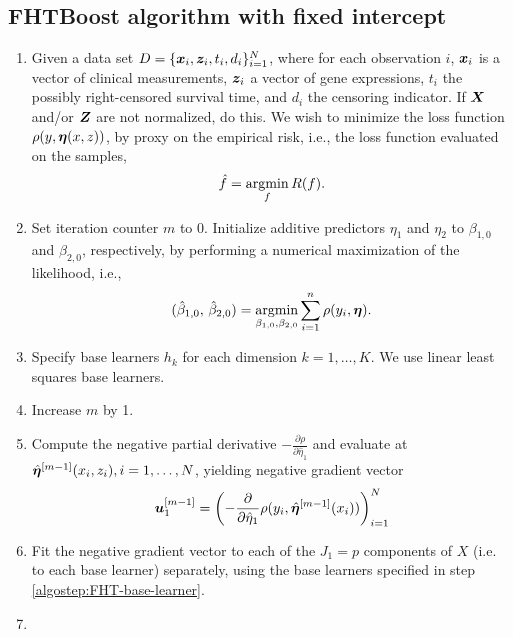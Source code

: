 \subsection{FHTBoost algorithm with fixed intercept}
\label{algo:fhtboost}
\begin{enumerate}
    \item
        Given a data set $D=\{\bm{x}_i, \bm{z}_i, t_i,d_i\}_{i=1}^N$, where for each observation $i$, $\bm{x}_i$ is a vector of clinical measurements,
        $\bm{z}_i$ a vector of gene expressions, $t_i$ the possibly right-censored survival time, and $d_i$ the censoring indicator. 
        If $\bm{X}$ and/or $\bm{Z}$ are not normalized, do this.
        We wish to minimize the loss function $\rho(y,\boldsymbol{\eta}(x,z))$, by proxy on the empirical risk, i.e., the loss function evaluated on the samples,
        \begin{equation}
            \hat{f}=\operatorname*{argmin}_{f}R(f).
        \end{equation}
    \item
        Set iteration counter $m$ to $0$.
        Initialize additive predictors $\eta_1$ and $\eta_2$ to $\beta_{1,0}$ and $\beta_{2,0}$, respectively, by performing a numerical maximization of the likelihood, i.e.,
        \begin{equation}
            (\hat{\beta}_{1,0},\,\hat{\beta}_{2,0})=\operatorname*{argmin}_{\beta_{1,0},\beta_{2,0}}\sum_{i=1}^n\rho(y_i,\boldsymbol{\eta}).
        \end{equation}
    \item\label{algostep:FHT-base-learner}
        Specify base learners $h_k$ for each dimension $k=1,\ldots,K$.
        We use linear least squares base learners.
    \item\label{algostep:FHT-init}
        Increase $m$ by 1.
    \item
        Compute the negative partial derivative $-\frac{\partial\rho}{\partial \hat{\eta}_1}$
        and evaluate at $\hat{\boldsymbol{\eta}}^{[m-1]}(x_i,z_i),i=1,\ldots,N$, yielding negative gradient vector
        \begin{equation}
            \bm{u}^{[m-1]}_1=\left(-\frac{\partial}{\partial \hat{\eta}_1}\rho(y_i, \hat{\boldsymbol{\eta}}^{[m-1]}(x_i))\right)_{i=1}^N
        \end{equation}
    \item
        Fit the negative gradient vector to each of the $J_1=p$ components of $X$ (i.e. to each base learner) separately, using the base learners specified in step \ref{algostep:FHT-base-learner}.
    \item

\end{enumerate}
